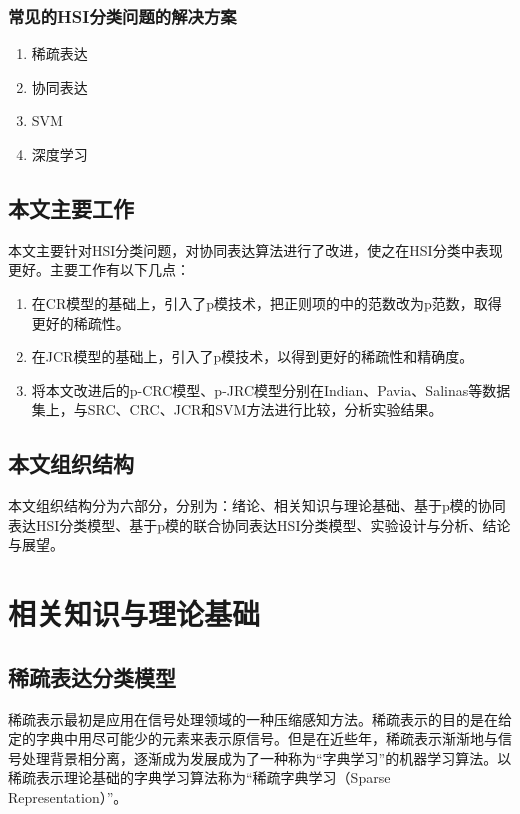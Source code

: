 \documentclass[12pt,a4paper]{article}
\begin{document}
\subsubsection{常见的HSI分类问题的解决方案}


\begin{enumerate}
\item 稀疏表达
\item 协同表达
\item SVM
\item 深度学习
\end{enumerate}


\subsection{本文主要工作}
本文主要针对HSI分类问题，对协同表达算法进行了改进，使之在HSI分类中表现更好。主要工作有以下几点：
\begin{enumerate}[(1)]
\item 在CR模型的基础上，引入了p模技术，把正则项的中的范数改为p范数，取得更好的稀疏性。
\item 在JCR模型的基础上，引入了p模技术，以得到更好的稀疏性和精确度。
\item 将本文改进后的p-CRC模型、p-JRC模型分别在Indian、Pavia、Salinas等数据集上，与SRC、CRC、JCR和SVM方法进行比较，分析实验结果。
\end{enumerate}

\subsection{本文组织结构}
本文组织结构分为六部分，分别为：绪论、相关知识与理论基础、基于p模的协同表达HSI分类模型、基于p模的联合协同表达HSI分类模型、实验设计与分析、结论与展望。






\section{相关知识与理论基础}
\subsection{稀疏表达分类模型}
稀疏表示最初是应用在信号处理领域的一种压缩感知方法。稀疏表示的目的是在给定的字典中用尽可能少的元素来表示原信号。但是在近些年，稀疏表示渐渐地与信号处理背景相分离，逐渐成为发展成为了一种称为“字典学习”的机器学习算法。以稀疏表示理论基础的字典学习算法称为“稀疏字典学习（Sparse Representation）”。
\end{document}
